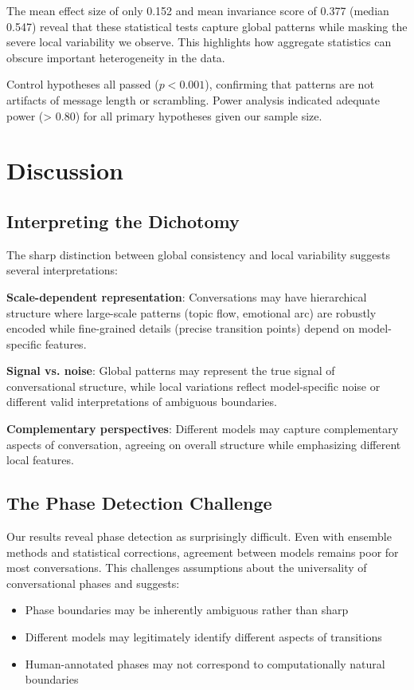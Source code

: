 \documentclass[11pt,letterpaper]{article}
\newcommand{\meanInvarianceScore}{0.377}
\newcommand{\medianInvarianceScore}{0.547}
\newcommand{\meanEffectSize}{0.152}
\begin{document}
The mean effect size of only \meanEffectSize{} and mean invariance score of \meanInvarianceScore{} (median \medianInvarianceScore{}) reveal that these statistical tests capture global patterns while masking the severe local variability we observe. This highlights how aggregate statistics can obscure important heterogeneity in the data.

Control hypotheses all passed ($p < 0.001$), confirming that patterns are not artifacts of message length or scrambling. Power analysis indicated adequate power (> 0.80) for all primary hypotheses given our sample size.

\section{Discussion}

\subsection{Interpreting the Dichotomy}

The sharp distinction between global consistency and local variability suggests several interpretations:

\textbf{Scale-dependent representation}: Conversations may have hierarchical structure where large-scale patterns (topic flow, emotional arc) are robustly encoded while fine-grained details (precise transition points) depend on model-specific features.

\textbf{Signal vs. noise}: Global patterns may represent the true signal of conversational structure, while local variations reflect model-specific noise or different valid interpretations of ambiguous boundaries.

\textbf{Complementary perspectives}: Different models may capture complementary aspects of conversation, agreeing on overall structure while emphasizing different local features.

\subsection{The Phase Detection Challenge}

Our results reveal phase detection as surprisingly difficult. Even with ensemble methods and statistical corrections, agreement between models remains poor for most conversations. This challenges assumptions about the universality of conversational phases and suggests:

\begin{itemize}
\item Phase boundaries may be inherently ambiguous rather than sharp
\item Different models may legitimately identify different aspects of transitions
\item Human-annotated phases may not correspond to computationally natural boundaries
\end{itemize}
\end{document}
